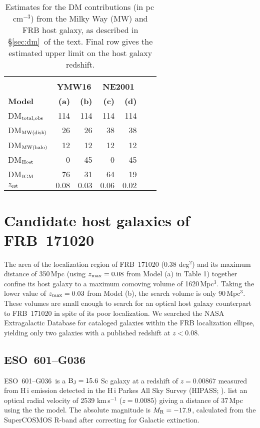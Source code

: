 \documentclass[twocolumn]{aastex63}
\newcommand{\galname}{ESO~601--G036}
\begin{document}
\begin{table}
\caption{Estimates for the DM contributions (in pc\,cm$^{-3}$) from the Milky Way (MW) and FRB host galaxy, as described in \S\ref{sec:dm}\ of the text. Final row gives the estimated upper limit on the host galaxy redshift. \label{DMtable}}

\begin{tabular}{lrrrrrr}
&&& \\
& \multicolumn{2}{c}{\bf YMW16} & \multicolumn{2}{c}{\bf NE2001} \\
{\bf Model} & {\bf (a)} & {\bf (b)} & {\bf (c)} & {\bf (d)} \\
 \hline
 DM$_{\rm total, obs}$ & 114 & 114 & 114 & 114 \\
\hline
 DM$_{\rm MW(disk)}$ & 26 & 26 & 38 & 38  \\
 DM$_{\rm MW(halo)}$ & 12 & 12 & 12 & 12 \\
 DM$_{\rm Host}$     & 0 & 45 &  0 & 45 \\
 DM$_{\rm IGM}$      & 76 & 31 & 64 & 19 \\
\hline 
$z_{\rm est}$ & $0.08$ &  $0.03$  & $0.06$ & $0.02$ \\
\hline
\end{tabular}
\end{table}

\section{Candidate host galaxies of FRB~171020} \label{sec:opticalsearch}

The area of the localization region of FRB~171020 (0.38 deg$^2$) and its maximum distance of 350\,Mpc (using $z_{\rm max}=0.08$ from Model (a) in Table 1) together confine its host galaxy to a maximum comoving volume of 1620\,Mpc$^3$.  Taking the lower value of $z_{\rm max}=0.03$ from Model (b), 
the search volume is only 90\,Mpc$^3$. 
These volumes are small enough 
to search for an optical host galaxy counterpart to FRB~171020 in spite of 
its poor localization. 
We searched the NASA Extragalactic Database for cataloged galaxies within the FRB localization ellipse, yielding only two galaxies with a published redshift at $z<0.08$.  

\subsection{\bf \galname} 
\galname\ is a $\rm{B_J}=15.6$ Sc galaxy \citep{esouppsala} at a redshift of $z=0.00867$ measured from \mbox{H\,{\sc i}} emission detected in the \mbox{H\,{\sc i}} Parkes All Sky Survey (HIPASS; \citealt{hipass}). 
\cite{dacosta1998} list an optical radial velocity of 2539 km\,s$^{-1}$ ($z=0.0085$) giving a distance of 37\,Mpc using the
the \cite{Mould2000} model. %
The absolute magnitude is $M_{\rm R}=-17.9$, calculated from the SuperCOSMOS R-band after correcting for Galactic extinction. 
\end{document}
